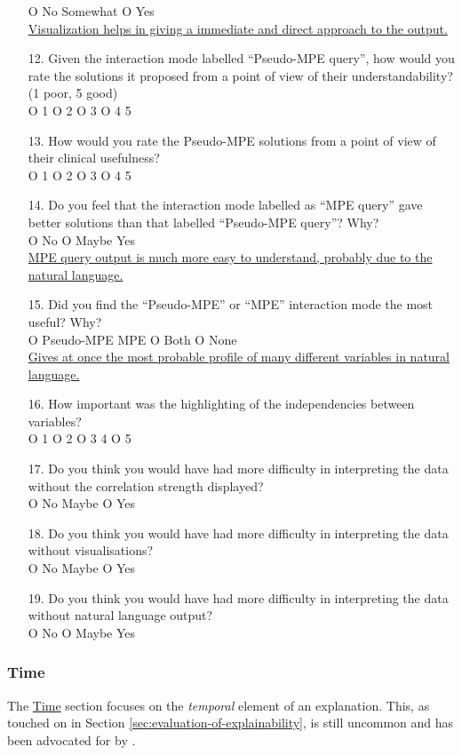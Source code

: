 \begin{framed}
\begin{enumerate}[resume]
		O No  Somewhat O Yes\\
		\ul{Visualization helps in giving a immediate and direct approach to the output.}
		\item[12.] Given the interaction mode labelled \enquote{Pseudo-MPE query}, how would you rate the solutions it proposed from a point of view of their understandability? (1 poor, 5 good) \\
		O 1 O 2 O 3 O 4  5
		\item[13.] How would you rate the Pseudo-MPE solutions from a point of view of their clinical usefulness? \\
		O 1 O 2 O 3 O 4  5
		\item[14.] Do you feel that the interaction mode labelled as \enquote{MPE query} gave better solutions than that labelled \enquote{Pseudo-MPE query}?  Why? \\
		O No O Maybe  Yes\\
		\ul{MPE query output is much more easy to understand, probably due to the natural language.}
		\item[15.] Did you find the \enquote{Pseudo-MPE} or \enquote{MPE} interaction mode the most useful?  Why? \\
		O Pseudo-MPE  MPE O Both O None\\
		\ul{Gives at once the most probable profile of many different variables in natural language.}
		\item[16.] How important was the highlighting of the independencies between variables? \\
		O 1 O 2 O 3  4 O 5
		\item[17.] Do you think you would have had more difficulty in interpreting the data without the correlation strength displayed? \\
		O No  Maybe O Yes
		\item[18.] Do you think you would have had more difficulty in interpreting the data without visualisations? \\
		O No  Maybe O Yes
		\item[19.] Do you think you would have had more difficulty in interpreting the data without natural language output? \\
		O No O Maybe  Yes
	\end{enumerate}
	\label{ques:features}
\end{framed}

\subsubsection{Time}
The \hyperref[ques:time]{Time} section focuses on the \textit{temporal} element of an explanation.
This, as touched on in Section \ref{sec:evaluation-of-explainability}, is still uncommon and has been advocated for by \citet{gilpin2018explaining}.

